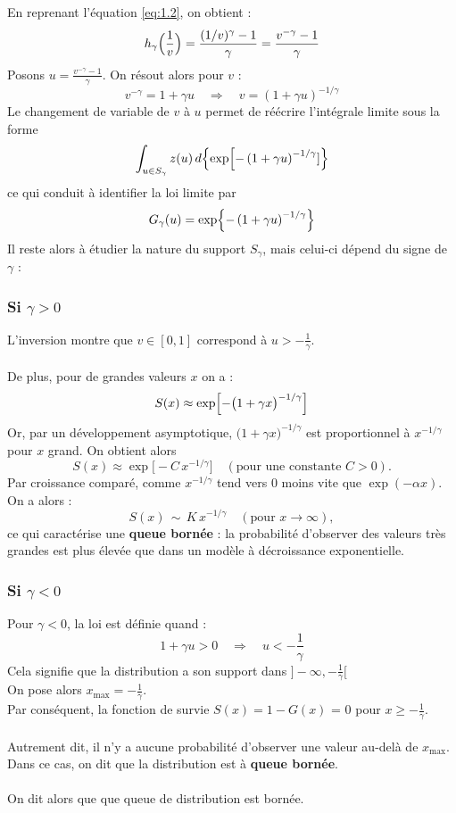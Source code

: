 \documentclass{article}
\begin{document}
En reprenant l'équation \eqref{eq:1.2}, on obtient :
\[
h_\gamma\Bigl(\frac{1}{v}\Bigr)=\frac{(1/v)^\gamma-1}{\gamma}=\frac{v^{-\gamma}-1}{\gamma}
\]
Posons \(u=\frac{v^{-\gamma}-1}{\gamma}\). On résout alors pour \(v\) :
\[
v^{-\gamma}=1+\gamma u\quad\Longrightarrow\quad v=(1+\gamma u)^{-1/\gamma}
\]
Le changement de variable de \(v\) à \(u\) permet de réécrire l'intégrale limite sous la forme
\[
\int_{u\in S_\gamma} z(u)\,d\Bigl\{\exp\Bigl[-\left(1+\gamma u\right)^{-1/\gamma}]\Bigr\}
\]
ce qui conduit à identifier la loi limite par
\[
G_\gamma(u)=\exp\Bigl\{-\left(1+\gamma u\right)^{-1/\gamma}\Bigr\}
\]
Il reste alors à étudier la nature du support \(S_\gamma\), mais celui-ci dépend du signe de \(\gamma\) :

\subsubsection{Si \(\gamma>0\)}
L'inversion montre que \(v\in [0,1]\) correspond à \(u>-\frac{1}{\gamma}\).
\\
\\
De plus, pour de grandes valeurs \(x\) on a :
\[
S(x) \approx \exp\Bigl[-\bigl(1 + \gamma x\bigr)^{-1/\gamma}\Bigr]
\]
Or, par un développement asymptotique,  \(\bigl(1 + \gamma x\bigr)^{-1/\gamma}\) est proportionnel à \(x^{-1/\gamma}\) pour \(x\) grand. On obtient alors
\[
S(x) \approx \exp\bigl[-C\,x^{-1/\gamma}\bigr] 
\quad (\text{pour une constante } C>0).
\]
Par croissance comparé, comme \(x^{-1/\gamma}\) tend vers 0 moins vite que \(\exp(-\alpha x)\). On a alors : 
\[
S(x)\,\sim\, K\,x^{-1/\gamma} 
\quad (\text{pour } x\to\infty),
\]
ce qui caractérise une \textbf{queue bornée} : la probabilité d'observer des valeurs très grandes est plus élevée que dans un modèle à décroissance exponentielle.

\subsubsection{Si \(\gamma<0\)}
Pour \(\gamma < 0\), la loi est définie quand :
\[
1 + \gamma u > 0 \quad \Longrightarrow \quad u < - \frac{1}{\gamma}
\]
Cela signifie que la distribution a son support dans \(]-\infty, - \frac{1}{\gamma} [ \) 
\\
On pose alors \(x_{\max} = - \frac{1}{\gamma} \).
\\
Par conséquent, la fonction de survie $S(x) = 1 - G(x)$ = 0 pour \(x \ge - \frac{1}{\gamma} \).
\\
\\
Autrement dit, il n'y a aucune probabilité d'observer une valeur au-delà de \(x_{\max}\). Dans ce cas, on dit que la distribution est à \textbf{queue bornée}.
\\
\\
On dit alors que que queue de distribution est bornée.
\end{document}
